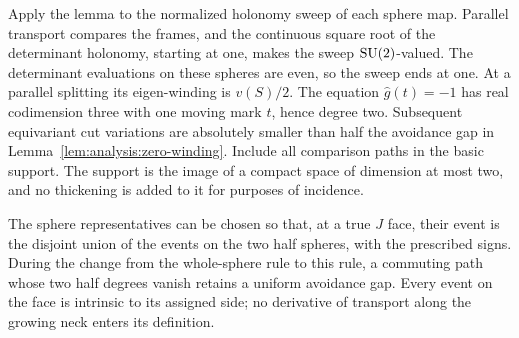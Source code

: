 Apply the lemma to the normalized holonomy sweep of each sphere map.
Parallel transport compares the frames, and the continuous square root
of the determinant holonomy, starting at one, makes the sweep
$\operatorname{SU}(2)$-valued.  The determinant evaluations on these spheres are even,
so the sweep ends at one.  At a parallel splitting its eigen-winding is
$v(S)/2$.  The equation $\widehat g(t)=-1$ has real codimension three with
one moving mark $t$, hence degree two.  Subsequent equivariant cut
variations are absolutely smaller than half the avoidance gap in
Lemma~\ref{lem:analysis:zero-winding}.  Include all comparison paths in
the basic support.  The support is the image of a compact space of
dimension at most two, and no thickening is added to it for purposes of
incidence.

\begin{lemma}\label{lem:analysis:segmentation}
The sphere representatives can be chosen so that, at a true $J$ face,
their event is the disjoint union of the events on the two half spheres,
with the prescribed signs.  During the change from the whole-sphere rule
to this rule, a commuting path whose two half degrees vanish retains a
uniform avoidance gap.  Every event on the face is intrinsic to its
assigned side; no derivative of transport along the growing neck enters
its definition.
\end{lemma}
